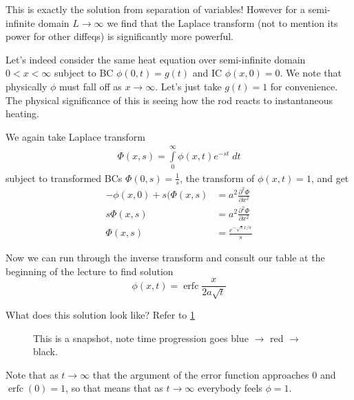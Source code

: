 \documentclass[10pt]{report}
\newcommand{\ptd}[2]{\frac{\partial^2 #1}{\partial#2^2}}
\DeclareMathOperator{\erfc}{erfc}
\begin{document}
This is exactly the solution from separation of variables! However for a semi-infinite domain $L \to \infty$ we find that the Laplace transform (not to mention its power for other diffeqs) is significantly more powerful.

Let's indeed consider the same heat equation over semi-infinite domain $0 < x < \infty$ subject to BC $\phi(0,t) = g(t)$ and IC $\phi(x,0) = 0$. We note that physically $\phi$ must fall off as $x \to \infty$. Let's just take $g(t) = 1$ for convenience. The physical significance of this is seeing how the rod reacts to instantaneous heating.

We again take Laplace transform
\begin{align}
    \Phi(x,s) = \int\limits_{0}^{\infty}\phi(x,t) e^{-st}\;dt
\end{align}
subject to transformed BCs $\Phi(0,s) = \frac{1}{s}$, the transform of $\phi(x,t) = 1$, and get
\begin{align}
    -\phi(x,0) + s(\Phi(x,s) &= a^2 \ptd{\Phi}{x}\\
    s\Phi(x,s) &= a^2 \ptd{\Phi}{x}\\
    \Phi(x,s) &= \frac{e^{-\sqrt{s}x/a}}{s}
\end{align}

Now we can run through the inverse transform and consult our table at the beginning of the lecture to find solution
\begin{equation}
    \phi(x,t) = \erfc\frac{x}{2a\sqrt{t}}
\end{equation}

What does this solution look like? Refer to \ref{5.5.plot}
\begin{figure}[!h]
    \centering
    \caption{This is a snapshot, note time progression goes blue $\to$ red $\to$ black.}
    \label{5.5.plot}
\end{figure}

Note that as $t \to \infty$ that the argument of the error function approaches $0$ and $\erfc(0) = 1$, so that means that as $t \to \infty$ everybody feels $\phi = 1$. 
\end{document}
